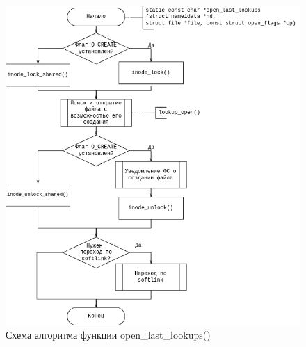 \begin{figure}[H]
	\centering
	\includegraphics[scale=0.6]{assets/flowchart-open_last_lookups.drawio.png}
	\caption{Схема алгоритма функции open\_last\_lookups()}
\end{figure}




